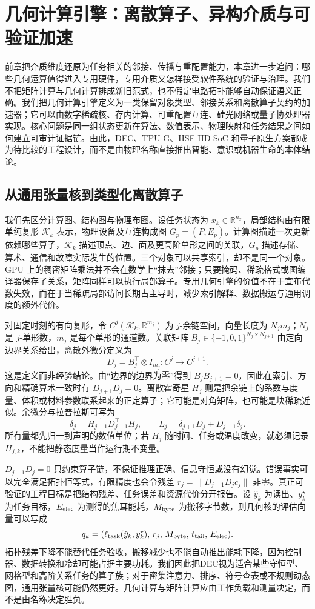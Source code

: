 \chapter{几何计算引擎：离散算子、异构介质与可验证加速}
\label{chap:geometric_computing_engines}

前章把介质维度还原为任务相关的邻接、传播与重配置能力，本章进一步追问：哪些几何运算值得进入专用硬件，专用介质又怎样接受软件系统的验证与治理。我们不把矩阵计算与几何计算排成新旧范式，也不假定电路拓扑能够自动保证语义正确。我们把几何计算引擎定义为一类保留对象类型、邻接关系和离散算子契约的加速器；它可以由数字稀疏核、存内计算、可重配置互连、硅光网络或量子协处理器实现。核心问题是同一组状态更新在算法、数值表示、物理映射和任务结果之间如何建立可审计证据链。由此，DEC、TPU-G、HSF-HD SoC 和量子原生方案都成为待比较的工程设计，而不是由物理名称直接推出智能、意识或机器生命的本体结论。

\section{从通用张量核到类型化离散算子}
\label{sec:section_7387}

我们先区分计算图、结构图与物理布图。设任务状态为 $x_k\in\mathbb{R}^{n_x}$，局部结构由有限单纯复形 $\mathcal K_k$ 表示，物理设备及互连构成图 $G_p=(P,E_p)$。计算图描述一次更新依赖哪些算子，$\mathcal K_k$ 描述顶点、边、面及更高阶单形之间的关联，$G_p$ 描述存储、算术、通信和故障实际发生的位置。三个对象可以共享索引，却不是同一个对象。GPU 上的稠密矩阵乘法并不会在数学上“抹去”邻接；只要掩码、稀疏格式或图编译器保存了关系，矩阵同样可以执行局部算子。专用几何引擎的价值不在于宣布代数失效，而在于当稀疏局部访问长期占主导时，减少索引解释、数据搬运与通用调度的额外代价。

对固定时刻的有向复形，令 $C^j(\mathcal K_k;\mathbb R^{m_j})$ 为 $j$-余链空间，向量长度为 $N_jm_j$；$N_j$ 是 $j$-单形数，$m_j$ 是每个单形的通道数。关联矩阵 $B_j\in\{-1,0,1\}^{N_j\times N_{j+1}}$ 由定向边界关系给出，离散外微分定义为
\[
D_j=B_j^\top\otimes I_{m_j}:C^j\longrightarrow C^{j+1}.
\]
这是定义而非经验结论。由“边界的边界为零”得到 $B_jB_{j+1}=0$，因此在索引、方向和精确算术一致时有 $D_{j+1}D_j=0$。离散霍奇星 $H_j$ 则是把余链上的系数与度量、体积或材料参数联系起来的正定算子；它可能是对角矩阵，也可能是块稀疏近似。余微分与拉普拉斯可写为
\[
\delta_j=H_{j-1}^{-1}D_{j-1}^{\top}H_j,\qquad
L_j=\delta_{j+1}D_j+D_{j-1}\delta_j.
\]
所有量都先归一到声明的数值单位；若 $H_j$ 随时间、任务或温度改变，就必须记录 $H_{j,k}$，不能把静态度量当作运行期不变量。

$D_{j+1}D_j=0$ 只约束算子链，不保证推理正确、信息守恒或没有幻觉。错误事实可以完全满足拓扑恒等式，有限精度也会令残差 $r_j=\|D_{j+1}D_jc_j\|$ 非零。真正可验证的工程目标是把结构残差、任务误差和资源代价分开报告。设 $\hat y_k$ 为读出、$y_k^\star$ 为任务目标，$E_{\rm elec}$ 为测得的焦耳能耗，$M_{\rm byte}$ 为搬移字节数，则几何核的评估向量可以写成
\[
q_k=(\ell_{\rm task}(\hat y_k,y_k^\star),\,r_j,\,M_{\rm byte},\,t_{\rm tail},\,E_{\rm elec}).
\]
拓扑残差下降不能替代任务验收，搬移减少也不能自动推出能耗下降，因为控制器、数据转换和冷却可能占据主要功耗。我们因此把DEC视为适合某些守恒型、网格型和高阶关系任务的算子族；对于密集注意力、排序、符号查表或不规则动态图，通用张量核可能仍然更好。几何计算与矩阵计算应由工作负载和测量决定，而不是由名称决定胜负。

